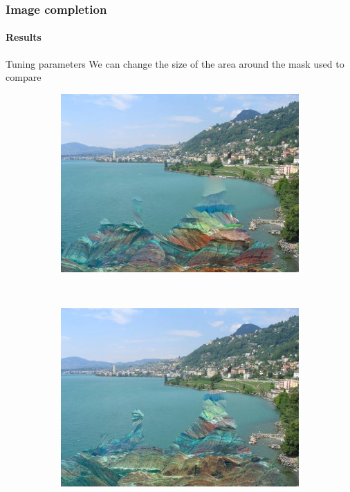 \documentclass[11pt]{beamer}
\begin{document}
\begin{frame}
\frametitle{Image completion}
\framesubtitle{Results}
\begin{block}{Tuning parameters}
We can change the size of the area around the mask used to compare
\end{block}

\begin{figure}
    \centering
    \begin{subfigure}[b]{0.45\textwidth}
        \includegraphics[width=\textwidth]{IMG_0681_paisajes-pintura-2_20}

    \end{subfigure}
    ~ 
        \begin{subfigure}[b]{0.45\textwidth}
        \includegraphics[width=\textwidth]{IMG_0681_paisajes-pintura-2_100}

    \end{subfigure}



\end{figure}
\end{frame}
\end{document}
